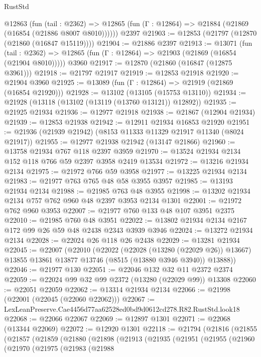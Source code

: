 \begin{lexlean}{RustStd}
\begin{coremodule}
    @12863
      (fun (tail : @2362) =>
      @12865 (fun (Γ : @12864) => @21884 (@21869 (@16854 (@21886 @8007 @8010))))))
    @2397
@21903 := @12853 (@21797 (@12870 (@21860 (@16847 @15119))))
@21904 := @21886 @2397
@21913 := @13071
    (fun (tail : @2362) => @12865 (fun (Γ : @12864) => @21903 (@21869 (@16854 (@21904 @8010)))))
    @3960
@21917 := @12870 (@21860 (@16847 (@12875 @3961)))
@21918 := @21797 @21917
@21919 := @12853 @21918
@21920 := @21904 @3960
@21925 := @13089 (fun (Γ : @12864) => @21919 (@21869 (@16854 @21920)))
@21928 := @13102 (@13105 (@15753 @13110))
@21934 := @21928 (@13118 (@13102 (@13119 (@13760 @13121)) @12892))
@21935 := @21925 @21934
@21936 := @12977 @21918
@21938 := @21867 (@12904 @21934)
@21939 := @12853 @21938
@21942 := @12911 @21934 @16853 @21920
@21951 := @21936 (@21939 @21942) (@8153 @11333 @11329 @21917 @11340 (@8024 @21917))
@21955 := @12977 @21938 @21942 (@13147 @21866)
@21960 := @13758 @21934 @767 @118 @2397 @3959
@21970 := @13524 @21934 @2134 @152 @118 @766 @59 @2397 @3958 @2419 @13534
@21972 := @13216 @21934 @2134
@21975 := @21972 @766 @59 @3958
@21977 := @13225 @21934 @2134
@21983 := @21977 @763 @765 @48 @58 @3955 @3957
@21985 := @13193 @21934 @2134
@21988 := @21985 @763 @48 @3955
@21998 := @13202 @21934 @2134 @757 @762 @960 @48 @2397 @3953 @2134 @1301
@22001 := @21972 @762 @960 @3953
@22007 := @21977 @760 @133 @48 @107 @3951 @2375
@22010 := @21985 @760 @48 @3951
@22022 := @13802 @21934 @2134 @2167 @172 @99 @26 @59 @48 @2438 @2343 @3939 @3946
@22024 := @13272 @21934 @2134
@22028 := @22024 @26 @118 @26 @2438
@22029 := @13281 @21934
@22045 := @22007
    (@22010
      (@22022
        (@22028 (@13280 (@22029 @26)) @13667)
        @13855
        @13861
        @13877
        @13746
        (@8515 (@13880 @3946 @3940))
        @13888))
@22046 := @21977 @130
@22051 := @22046 @132 @32 @11 @2372 @2374
@22059 := @22024 @99 @32 @99 @2372 (@13280 (@22029 @99)) @13308
@22060 := @22051 @22059
@22062 := @13314 @21934 @2134
@22066 := @21998 (@22001 (@22045 (@22060 @22062)))
@22067 := LexLeanPreserve.Cae4456d77aa62528ed0bd9d0612cd278.R82.RustStd.look18
@22068 := @22066 @22067
@22069 := @12897 @1301
@22071 := @22068 (@13344 @22069)
@22072 := @12920 @1301
@22118 := @21794
    (@21816
      (@21855
        (@21857
          (@21859
            (@21880
              (@21898
                (@21913
                  (@21935
                    (@21951
                      (@21955
                        (@21960
                          (@21970
                            (@21975
                              (@21983
                                (@21988

\end{coremodule}
\end{lexlean}
